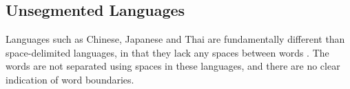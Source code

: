 
\subsection{Unsegmented Languages}
Languages such as Chinese, Japanese and Thai are fundamentally different than space-delimited languages, in that they lack any spaces between words \cite{indurkhya2010handbook}. The words are not separated using spaces in these languages, and there are no clear indication of word boundaries. 